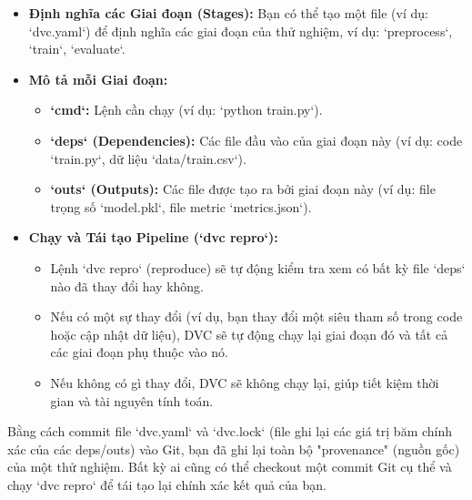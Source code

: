 \begin{itemize}
    \item \textbf{Định nghĩa các Giai đoạn (Stages):} Bạn có thể tạo một file (ví dụ: `dvc.yaml`) để định nghĩa các giai đoạn của thử nghiệm, ví dụ: `preprocess`, `train`, `evaluate`.
    \item \textbf{Mô tả mỗi Giai đoạn:}
        \begin{itemize}
            \item \textbf{`cmd`:} Lệnh cần chạy (ví dụ: `python train.py`).
            \item \textbf{`deps` (Dependencies):} Các file đầu vào của giai đoạn này (ví dụ: code `train.py`, dữ liệu `data/train.csv`).
            \item \textbf{`outs` (Outputs):} Các file được tạo ra bởi giai đoạn này (ví dụ: file trọng số `model.pkl`, file metric `metrics.json`).
        \end{itemize}
    \item \textbf{Chạy và Tái tạo Pipeline (`dvc repro`):}
        \begin{itemize}
            \item Lệnh `dvc repro` (reproduce) sẽ tự động kiểm tra xem có bất kỳ file `deps` nào đã thay đổi hay không.
            \item Nếu có một sự thay đổi (ví dụ, bạn thay đổi một siêu tham số trong code hoặc cập nhật dữ liệu), DVC sẽ tự động chạy lại giai đoạn đó và tất cả các giai đoạn phụ thuộc vào nó.
            \item Nếu không có gì thay đổi, DVC sẽ không chạy lại, giúp tiết kiệm thời gian và tài nguyên tính toán.
        \end{itemize}
\end{itemize}
Bằng cách commit file `dvc.yaml` và `dvc.lock` (file ghi lại các giá trị băm chính xác của các deps/outs) vào Git, bạn đã ghi lại toàn bộ "provenance" (nguồn gốc) của một thử nghiệm. Bất kỳ ai cũng có thể checkout một commit Git cụ thể và chạy `dvc repro` để tái tạo lại chính xác kết quả của bạn.

